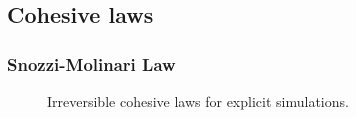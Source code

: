 
\subsection{Cohesive laws}

\subsubsection{Snozzi-Molinari Law}

\begin{figure}
  \centering
  \qquad
  \caption{Irreversible cohesive laws for explicit simulations.}
  \label{fig:smm:coh:linear_cohesive_law}
\end{figure}

